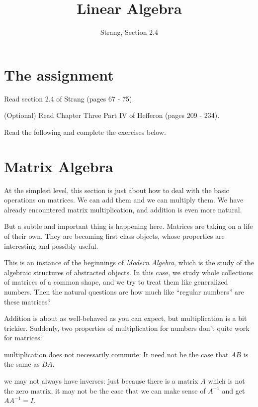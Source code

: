 \documentclass[11pt]{amsart}
\theoremstyle{definition}
\begin{document}
\title{Linear Algebra}
\author{Strang, Section 2.4}
\maketitle

\section{The assignment}
\begin{compactitem}
\item Read section 2.4 of Strang (pages 67 - 75).
\item (Optional) Read Chapter Three Part IV of Hefferon (pages 209 - 234).
\item Read the following and complete the exercises below.
\end{compactitem}


\section{Matrix Algebra}

At the simplest level, this section is just about how to deal with the basic operations on matrices. We can add them and we can multiply them. We have already encountered matrix multiplication, and addition is even more natural.

But a subtle and important thing is happening here. Matrices are taking on a life of their own. They are becoming first class objects, whose properties are interesting and possibly useful.

This is an instance of the beginnings of \emph{Modern Algebra}, which is the study of the algebraic structures of abstracted objects. In this case, we study whole collections of matrices of a common shape, and we try to treat them like generalized numbers. Then the natural questions are how much like ``regular numbers'' are these matrices?

Addition is about as well-behaved as you can expect, but multiplication is a bit trickier. Suddenly, two properties of multiplication for numbers don't quite work for matrices:
\begin{compactitem}
\item multiplication does not necessarily commute: It need not be the case that $AB$ is the same as $BA$.
\item we may not always have inverses: just because there is a matrix $A$ which is not the zero matrix, it may not be the case that we can make sense of $A^{-1}$ and get $AA^{-1} = I$.
\end{compactitem}
\end{document}
